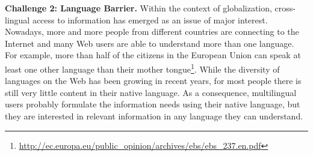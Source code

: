 \noindent  \textbf{Challenge 2: Language Barrier.} 
Within the context of globalization, cross-lingual access to information has emerged as an issue of major interest. 
Nowadays, more and more people from different countries are connecting to the Internet and many Web users are able to understand more than one language. 
For example, more than half of the citizens in the European Union can speak at least one other language than their mother tongue\footnote{\url{http://ec.europa.eu/public_opinion/archives/ebs/ebs_237.en.pdf}}.
While the diversity of languages on the Web has been growing in recent years, for most people there is still very little content in their native language. 
As a consequence, 
multilingual users probably formulate the information needs using their native language, but they are interested in relevant information in any language they can understand. 
